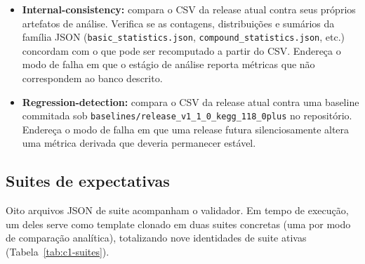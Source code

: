 \begin{itemize}
    \item \textbf{Internal-consistency:} compara o CSV da release atual contra seus próprios artefatos de análise. Verifica se as contagens, distribuições e sumários da família JSON (\texttt{basic\_statistics.json}, \texttt{compound\_statistics.json}, etc.) concordam com o que pode ser recomputado a partir do CSV. Endereça o modo de falha em que o estágio de análise reporta métricas que não correspondem ao banco descrito.

    \item \textbf{Regression-detection:} compara o CSV da release atual contra uma baseline commitada sob \texttt{baselines/release\_v1\_1\_0\_kegg\_118\_0plus} no repositório. Endereça o modo de falha em que uma release futura silenciosamente altera uma métrica derivada que deveria permanecer estável.
\end{itemize}

\subsection{Suites de expectativas}

Oito arquivos JSON de suite acompanham o validador. Em tempo de execução, um deles serve como template clonado em duas suites concretas (uma por modo de comparação analítica), totalizando nove identidades de suite ativas (Tabela~\ref{tab:c1-suites}).

